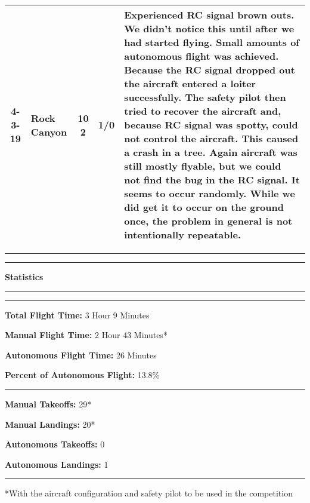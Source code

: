 \documentclass[]{auvsi_doc}
\begin{document}
\begin{center}
\begin{longtable}{| c | p{2 cm} | c | c | p{7.25 cm} |}
	\hline
	4-3-19				& Rock Canyon	&		\makecell{10 \\ \textbf{2}}  & 1/0			& Experienced RC signal brown outs. We didn't notice this until after we had started flying. Small amounts of autonomous flight was achieved. Because the RC signal dropped out the aircraft entered a loiter successfully. The safety pilot then tried to recover the aircraft and, because RC signal was spotty, could not control the aircraft. This caused a crash in a tree. Again aircraft was still mostly flyable, but we could not find the bug in the RC signal. It seems to occur randomly. While we did get it to occur on the ground once, the problem in general is not intentionally repeatable. \\
	\hline
\end{longtable}
\egroup
\label{table:Results}

\hrule
\rule{\textwidth}{0.1pt}
\textbf{Statistics}
\rule{\textwidth}{0.1pt}
\hrule

\end{center}

\textbf{Total Flight Time:} 3 Hour 9 Minutes 

\textbf{Manual Flight Time:} 2 Hour 43 Minutes*

\textbf{Autonomous Flight Time:} 26 Minutes

\textbf{Percent of Autonomous Flight:} 13.8\%

\hrule
\textbf{Manual Takeoffs:} 29*

\textbf{Manual Landings:} 20*

\textbf{Autonomous Takeoffs:} 0

\textbf{Autonomous Landings:} 1

\hrule
*With the aircraft configuration and safety pilot to be used in the competition
\end{document}

